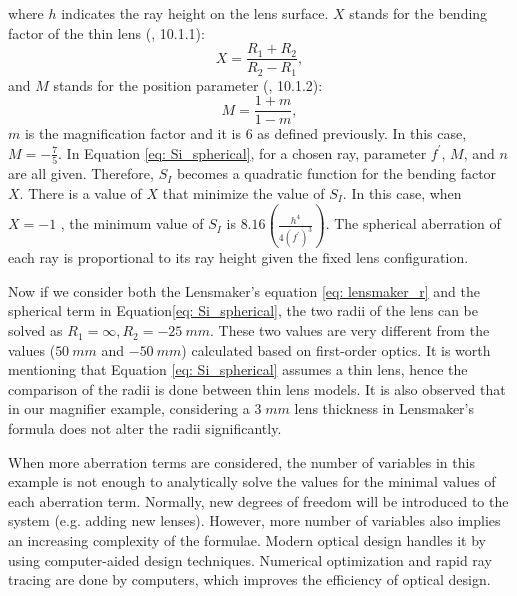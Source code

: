where $h$ indicates the ray height on the lens surface. $X$ stands for the bending factor of the thin lens (\cite{GrossHBOvol1}, 10.1.1):
\begin{equation} \label{eqn: bending factor}
X = \frac{R_1+R_2}{R_2-R_1},
\end{equation}and $M$ stands for the position parameter (\cite{GrossHBOvol1}, 10.1.2):
\begin{equation} \label{eqn: position parameter}
M = \frac{1+m}{1-m},
\end{equation}$m$ is the magnification factor and it is $6$ as defined previously. In this case, $M=-\frac{7}{5}$. In Equation \ref{eq: Si_spherical}, for a chosen ray, parameter $f^\prime$, $M$, and $n$ are all given. Therefore, $S_I$ becomes a quadratic function for the bending factor $X$. There is a value of $X$ that minimize the value of $S_I$. In this case, when $X = -1$ , the minimum value of $S_I $ is $ 8.16(\frac{h^4}{4(f^\prime)^3})$. The spherical aberration of each ray is proportional to its ray height given the fixed lens configuration. 

Now if we consider both the Lensmaker's equation \ref{eq: lensmaker_r} and the spherical term in Equation\ref{eq: Si_spherical}, the two radii of the lens can be solved as $R_1 = \infty, R_2 = -25\ mm$. These two values are very different from the values ($50 \ mm$ and $-50 \ mm$) calculated based on first-order optics. It is worth mentioning that Equation \ref{eq: Si_spherical} assumes a thin lens, hence the comparison of the radii is done between thin lens models. It is also observed that in our magnifier example, considering a $3 \;mm$ lens thickness in Lensmaker's formula does not alter the radii significantly.  

When more aberration terms are considered, the number of variables in this example is not enough to analytically solve the values for the minimal values of each aberration term. Normally, new degrees of freedom will be introduced to the system (e.g. adding new lenses). However, more number of variables also implies an increasing complexity of the formulae. Modern optical design handles it by using computer-aided design techniques. Numerical optimization and rapid ray tracing are done by computers, which improves the efficiency of optical design.  


